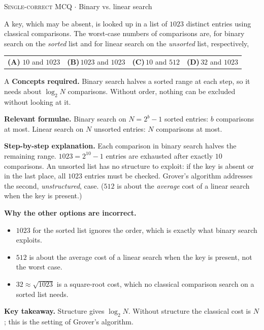 \documentclass[11pt,a4paper]{article}
\newcommand{\optlabel}[1]{\textbf{(#1)}}
\newcommand{\correctlabel}[1]{\textcolor{okgreen}{\textbf{(#1)}\,\ding{51}}}
\newenvironment{qitem}[1]{\begin{list}{}{\setlength{\leftmargin}{3.3em}\setlength{\labelwidth}{3.1em}%
  \setlength{\labelsep}{0.2em}\setlength{\topsep}{3pt}\setlength{\parsep}{3pt}}\item[\textbf{Q.#1}\hfill]}{\end{list}}
\newcommand{\qsep}{\par\vspace{2pt}{\color{black!15}\hrule}\vspace{4pt}}
\newcommand{\qmeta}[2]{{\footnotesize\color{black!60}\textsc{#1} \;$\cdot$\; #2}\par}
\begin{document}
\begin{qitem}{9}
\qmeta{Single-correct MCQ}{Binary vs. linear search}
A key, which may be absent, is looked up in a list of $1023$ distinct entries using classical comparisons. The worst-case numbers of comparisons are, for binary search on the \emph{sorted} list and for linear search on the \emph{unsorted} list, respectively,
\par\smallskip\noindent\begin{tabularx}{\linewidth}{@{}*{4}{L}@{}}
\correctlabel{A}\,$10$ and $1023$ & \optlabel{B}\,$1023$ and $1023$ & \optlabel{C}\,$10$ and $512$ & \optlabel{D}\,$32$ and $1023$
\end{tabularx}
\end{qitem}
\begin{solbox}{A}
\textbf{\color{brand}Concepts required.} Binary search halves a sorted range at each step, so it needs about $\log_2 N$ comparisons. Without order, nothing can be excluded without looking at it.

\textbf{\color{brand}Relevant formulae.} Binary search on $N = 2^b - 1$ sorted entries: $b$ comparisons at most. Linear search on $N$ unsorted entries: $N$ comparisons at most.

\textbf{\color{brand}Step-by-step explanation.} Each comparison in binary search halves the remaining range. $1023 = 2^{10} - 1$ entries are exhausted after exactly $10$ comparisons. An unsorted list has no structure to exploit: if the key is absent or in the last place, all $1023$ entries must be checked.
Grover's algorithm addresses the second, \emph{unstructured}, case. ($512$ is about the \emph{average} cost of a linear search when the key is present.)

\textbf{\color{brand}Why the other options are incorrect.}
\begin{itemize}[leftmargin=2.4em, itemsep=1pt, topsep=2pt]
\item[\textbf{(B)}] $1023$ for the sorted list ignores the order, which is exactly what binary search exploits.
\item[\textbf{(C)}] $512$ is about the average cost of a linear search when the key is present, not the worst case.
\item[\textbf{(D)}] $32 \approx \sqrt{1023}$ is a square-root cost, which no classical comparison search on a sorted list needs.
\end{itemize}
\textbf{\color{brand}Key takeaway.} Structure gives $\log_2 N$. Without structure the classical cost is $N$; this is the setting of Grover's algorithm.
\end{solbox}
\qsep
\end{document}
